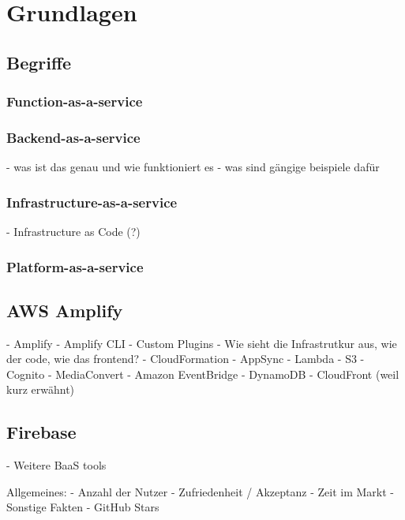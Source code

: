 \chapter{Grundlagen}

\section{Begriffe}
  \autocite{jiang2020overview}
  \autocite{kumar2019serverless}
  \autocite{dahunsi2021commercial}

  \subsection{Function-as-a-service}
  \subsection{Backend-as-a-service}
  - was ist das genau und wie funktioniert es
  - was sind gängige beispiele dafür
  \subsection{Infrastructure-as-a-service}
- Infrastructure as Code (?)

  \subsection{Platform-as-a-service}

\section{AWS Amplify}

\autocite{dahunsi2021commercial}
\autocite{amplifyDocs}
\autocite{lysakov2021security}
\autocite{mathew2014overview}
\autocite{beach2014aws}

  - Amplify
  - Amplify CLI
  - Custom Plugins
  - Wie sieht die Infrastrutkur aus, wie der code, wie das frontend?
  - CloudFormation
  - AppSync
  - Lambda
  - S3
  - Cognito
  - MediaConvert
  - Amazon EventBridge
  - DynamoDB
  - CloudFront (weil kurz erwähnt)

\section{Firebase}

\autocite{moroney2017definitive}
\autocite{firebaseDocs}
\autocite{tanna2018serverless}

- Weitere BaaS tools

Allgemeines:
  - Anzahl der Nutzer
  - Zufriedenheit / Akzeptanz
  - Zeit im Markt
  - Sonstige Fakten
  - GitHub Stars